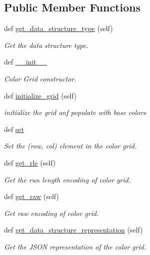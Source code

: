 \subsection*{Public Member Functions}
\begin{DoxyCompactItemize}
\item 
def \hyperlink{classbridges_1_1color__grid_1_1_color_grid_a4dbf23124fdc8edae222c100cf7b9363}{get\+\_\+data\+\_\+structure\+\_\+type} (self)
\begin{DoxyCompactList}\small\item\em Get the data structure type. \end{DoxyCompactList}\item 
def \hyperlink{classbridges_1_1color__grid_1_1_color_grid_aa4b484e518b5fc0c970ea36e8500dbe5}{\+\_\+\+\_\+init\+\_\+\+\_\+}
\begin{DoxyCompactList}\small\item\em Color Grid constructor. \end{DoxyCompactList}\item 
def \hyperlink{classbridges_1_1color__grid_1_1_color_grid_ad2b3ab19751cbf629096a25e31bb7f42}{initialize\+\_\+grid} (self)
\begin{DoxyCompactList}\small\item\em initialize the grid anf populate with base colors \end{DoxyCompactList}\item 
def \hyperlink{classbridges_1_1color__grid_1_1_color_grid_a746dde66b828253bd0dfb32c906729fe}{set}
\begin{DoxyCompactList}\small\item\em Set the (row, col) element in the color grid. \end{DoxyCompactList}\item 
def \hyperlink{classbridges_1_1color__grid_1_1_color_grid_a48ded4391e60e4f42213fb3711730614}{get\+\_\+rle} (self)
\begin{DoxyCompactList}\small\item\em Get the run length encoding of color grid. \end{DoxyCompactList}\item 
def \hyperlink{classbridges_1_1color__grid_1_1_color_grid_ab6685633fe237eb118cf2db2f624cd60}{get\+\_\+raw} (self)
\begin{DoxyCompactList}\small\item\em Get raw encoding of color grid. \end{DoxyCompactList}\item 
def \hyperlink{classbridges_1_1color__grid_1_1_color_grid_afda80f44711e0c32c96161d1e681d788}{get\+\_\+data\+\_\+structure\+\_\+representation} (self)
\begin{DoxyCompactList}\small\item\em Get the J\+S\+ON representation of the color grid. \end{DoxyCompactList}\end{DoxyCompactItemize}
